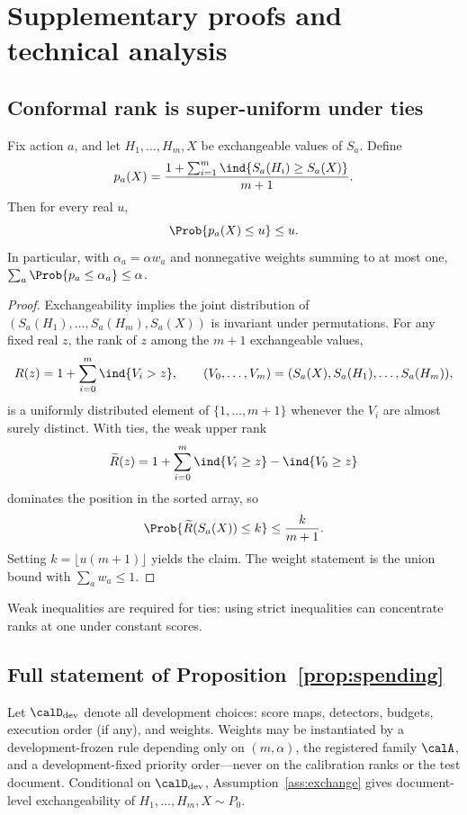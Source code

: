 \section{Supplementary proofs and technical analysis}\label{app:proofs}

\subsection{Conformal rank is super-uniform under ties}

\begin{lemma}\label{lem:rank}
Fix action \(a\), and let \(H_1,\ldots,H_m,X\) be exchangeable values of \(S_a\). Define
\[
 p_a(X)=\frac{1+\sum_{i=1}^{m}\ind\{S_a(H_i)\geq S_a(X)\}}{m+1}.
\]
Then for every real \(u\),
\[
 \Prob\{p_a(X)\leq u\}\leq u.
\]
In particular, with \(\alpha_a=\alpha w_a\) and nonnegative weights summing to at most one, \(\sum_a\Prob\{p_a\leq\alpha_a\}\leq\alpha\).
\end{lemma}
\begin{proof}
Exchangeability implies the joint distribution of \((S_a(H_1),\ldots,S_a(H_m),S_a(X))\) is invariant under permutations. For any fixed real \(z\), the rank of \(z\) among the \(m+1\) exchangeable values,
\[
 R(z)=1+\sum_{i=0}^{m}\ind\{V_i>z\},\qquad
 (V_0,\ldots,V_m)=(S_a(X),S_a(H_1),\ldots,S_a(H_m)),
\]
is a uniformly distributed element of \(\{1,\ldots,m+1\}\) whenever the \(V_i\) are almost surely distinct. With ties, the weak upper rank
\[
 \widetilde R(z)=1+\sum_{i=0}^{m}\ind\{V_i\geq z\}-\ind\{V_0\geq z\}
\]
dominates the position in the sorted array, so
\[
 \Prob\{\widetilde R(S_a(X))\leq k\}\leq \frac{k}{m+1}.
\]
Setting \(k=\lfloor u(m+1)\rfloor\) yields the claim. The weight statement is the union bound with \(\sum_a w_a\leq1\).
\end{proof}

Weak inequalities are required for ties: using strict inequalities can concentrate ranks at one under constant scores.

\subsection{Full statement of Proposition~\ref{prop:spending}}\label{app:registered}

Let \(\calD_{\rm dev}\) denote all development choices: score maps, detectors, budgets, execution order (if any), and weights. Weights may be instantiated by a development-frozen rule depending only on \((m,\alpha)\), the registered family \(\calA\), and a development-fixed priority order---never on the calibration ranks or the test document. Conditional on \(\calD_{\rm dev}\), Assumption~\ref{ass:exchange} gives document-level exchangeability of \(H_1,\ldots,H_m,X\sim P_0\).

